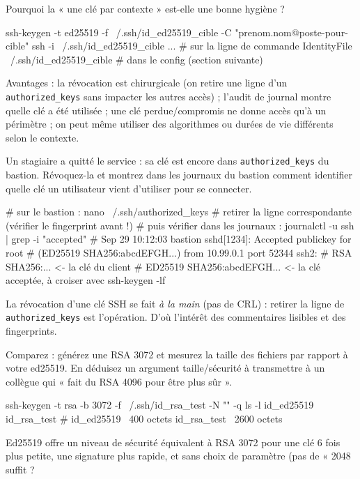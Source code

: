 \documentclass[a4paper,10pt]{exam}
\begin{document}
\begin{questions}
Pourquoi la « une clé par contexte » est-elle une bonne hygiène ?
\begin{solution}
\begin{bashcode}
ssh-keygen -t ed25519 -f ~/.ssh/id_ed25519_cible -C "prenom.nom@poste-pour-cible"
ssh -i ~/.ssh/id_ed25519_cible ...    # sur la ligne de commande
IdentityFile ~/.ssh/id_ed25519_cible  # dans le config (section suivante)
\end{bashcode}
Avantages : la révocation est chirurgicale (on retire une ligne d'un
\texttt{authorized\_keys} sans impacter les autres accès) ; l'audit de journal montre
quelle clé a été utilisée ; une clé perdue/compromis ne donne accès qu'à un périmètre ;
on peut même utiliser des algorithmes ou durées de vie différents selon le contexte.
\end{solution}
\question Un stagiaire a quitté le service : sa clé est encore dans
\texttt{authorized\_keys} du bastion. Révoquez-la et montrez dans les journaux du bastion
comment identifier quelle clé un utilisateur vient d'utiliser pour se connecter.
\begin{solution}
\begin{bashcode}
# sur le bastion :
nano ~/.ssh/authorized_keys     # retirer la ligne correspondante (vérifier le fingerprint avant !)
# puis vérifier dans les journaux :
journalctl -u ssh | grep -i "accepted"
# Sep 29 10:12:03 bastion sshd[1234]: Accepted publickey for root
#   (ED25519 SHA256:abcdEFGH...) from 10.99.0.1 port 52344 ssh2:
#   RSA SHA256:...             <- la clé du client
#   ED25519 SHA256:abcdEFGH... <- la clé acceptée, à croiser avec ssh-keygen -lf
\end{bashcode}
La révocation d'une clé SSH se fait \emph{à la main} (pas de CRL) : retirer la ligne de
\texttt{authorized\_keys} est l'opération. D'où l'intérêt des commentaires lisibles et
des fingerprints.
\end{solution}
\question Comparez : générez une RSA 3072 et mesurez la taille des fichiers par rapport à
votre ed25519. En déduisez un argument taille/sécurité à transmettre à un collègue
qui « fait du RSA 4096 pour être plus sûr ».
\begin{solution}
\begin{bashcode}
ssh-keygen -t rsa -b 3072 -f ~/.ssh/id_rsa_test -N "" -q
ls -l id_ed25519 id_rsa_test
# id_ed25519  ~400 octets   id_rsa_test ~2600 octets
\end{bashcode}
Ed25519 offre un niveau de sécurité équivalent à RSA 3072 pour une clé 6 fois plus
petite, une signature plus rapide, et sans choix de paramètre (pas de « 2048 suffit ?

\end{solution}
\end{questions}
\end{document}
